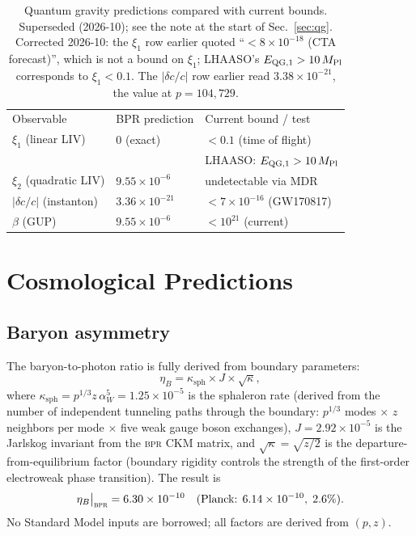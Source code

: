 \documentclass[aps,prd,twocolumn,superscriptaddress,longbibliography,nofootinbib]{revtex4-2}
\newcommand{\MPl}{M_{\mathrm{Pl}}}
\newcommand{\bpr}{\textsc{bpr}}
\begin{document}
\begin{table}[h]
\caption{Quantum gravity predictions compared with current bounds.
Superseded (2026-10); see the note at the start of
Sec.~\ref{sec:qg}.  Corrected 2026-10: the $\xi_1$ row earlier
quoted ``$<8\times10^{-18}$ (CTA forecast)'', which is not a bound on
$\xi_1$; LHAASO's $E_{\rm QG,1}>10\,\MPl$ corresponds to
$\xi_1 < 0.1$.  The $|\delta c/c|$ row earlier read
$3.38\times10^{-21}$, the value at $p = 104{,}729$.}
\label{tab:qg}
\begin{ruledtabular}
\begin{tabular}{lll}
Observable & BPR prediction & Current bound / test \\
\colrule
$\xi_1$ (linear LIV) & $0$ (exact) &  $<0.1$ (time of flight) \\
                      &              & LHAASO: $E_{\rm QG,1}>10\,\MPl$ \\
$\xi_2$ (quadratic LIV) & $9.55\times10^{-6}$ & undetectable via MDR \\
$|\delta c/c|$ (instanton) & $3.36\times10^{-21}$ & $<7\times10^{-16}$ (GW170817) \\
$\beta$ (GUP) & $9.55\times10^{-6}$ & $<10^{21}$ (current) \\
\end{tabular}
\end{ruledtabular}
\end{table}


\section{Cosmological Predictions}
\label{sec:cosmo}

\subsection{Baryon asymmetry}

The baryon-to-photon ratio is fully derived from boundary parameters:
\begin{equation}
\eta_B = \kappa_{\mathrm{sph}} \times J \times \sqrt{\kappa},
\label{eq:eta}
\end{equation}
where $\kappa_{\mathrm{sph}} = p^{1/3} z\, \alpha_W^5 = 1.25\times10^{-5}$
is the sphaleron rate (derived from the number of independent tunneling
paths through the boundary: $p^{1/3}$ modes $\times$ $z$ neighbors per mode
$\times$ five weak gauge boson exchanges), $J = 2.92\times10^{-5}$ is the
Jarlskog invariant from the \bpr{} CKM matrix, and $\sqrt{\kappa} = \sqrt{z/2}$
is the departure-from-equilibrium factor (boundary rigidity controls the
strength of the first-order electroweak phase transition).
The result is
\begin{equation}
\eta_B\big|_{\bpr} = 6.30 \times 10^{-10}
\quad (\text{Planck: }6.14 \times 10^{-10},\; 2.6\%).
\end{equation}
No Standard Model inputs are borrowed; all factors are derived from $(p, z)$.
\end{document}
